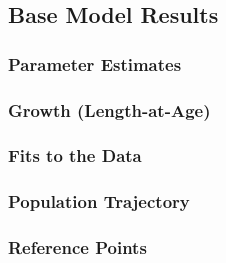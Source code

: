 \documentclass[11pt,
  english,
  a4paper,
]{article}
\begin{document}
\leavevmode\tagmcend\tagstructend


\hypertarget{base-model-results}{%
\subsection{Base Model Results}\label{base-model-results}}

\leavevmode\tagmcend\tagstructend


\hypertarget{parameter-estimates}{%
\subsubsection{Parameter Estimates}\label{parameter-estimates}}

\leavevmode\tagmcend\tagstructend


\hypertarget{growth-length-at-age}{%
\subsubsection{Growth (Length-at-Age)}\label{growth-length-at-age}}

\leavevmode\tagmcend\tagstructend


\hypertarget{fits-to-the-data}{%
\subsubsection{Fits to the Data}\label{fits-to-the-data}}

\leavevmode\tagmcend\tagstructend


\hypertarget{population-trajectory}{%
\subsubsection{Population Trajectory}\label{population-trajectory}}

\leavevmode\tagmcend\tagstructend


\hypertarget{reference-points-1}{%
\subsubsection{Reference Points}\label{reference-points-1}}
\end{document}
